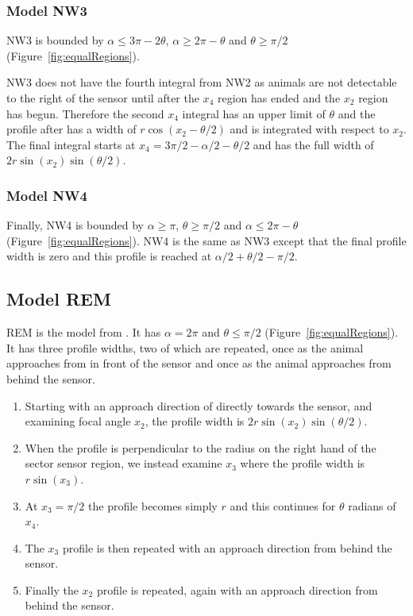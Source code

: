 


\subsubsection{Model NW3} \label{NW3}

NW3 is bounded by $\alpha \le 3\pi - 2\theta$, $\alpha\ge 2\pi-\theta$ and $\theta\ge\pi/2$ (Figure~\ref{fig:equalRegions}).

NW3 does not have the fourth integral from NW2 as animals are not detectable to the right of the sensor until after the $x_4$ region has ended and the $x_2$ region has begun.
Therefore the second $x_4$ integral has an upper limit of $\theta $ and the profile after has a width of $r\cos(x_2 - \theta/2)$ and is integrated with respect to $x_2$.
The final integral starts at $x_4 = 3\pi/2 - \alpha/2 - \theta/2$ and has the full width of $2r\sin(x_2)\sin(\theta/2)$.



\subsubsection{Model NW4} \label{NW4}

Finally, NW4 is bounded by $\alpha\ge \pi$, $\theta\ge \pi/2$ and $\alpha \le 2\pi - \theta$ (Figure~\ref{fig:equalRegions}).
NW4 is the same as NW3 except that the final profile width is zero and this profile is reached at $\alpha/2+\theta/2-\pi/2$.




\subsection{Model REM} \label{REM}

REM is the model from \cite{rowcliffe2008estimating}.
It has $\alpha =2\pi$ and $\theta \le \pi/2$ (Figure~\ref{fig:equalRegions}).
It has three profile widths, two of which are repeated, once as the animal approaches from in front of the sensor and once as the animal approaches from behind the sensor.

\begin{enumerate}
\item Starting with an approach direction of directly towards the sensor, and examining focal angle $x_2$, the profile width is $2r\sin(x_2)\sin(\theta/2)$.
\item When the profile is perpendicular to the radius on the right hand of the sector sensor region, we instead examine $x_3$ where the profile width is $r\sin(x_3)$.
\item At $x_3=\pi/2$ the profile becomes simply $r$ and this continues for $\theta $ radians of $x_4$.
\item The $x_3$ profile is then repeated with an approach direction from behind the sensor.
\item Finally the $x_2$ profile is repeated, again with an approach direction from behind the sensor.
\end{enumerate}

